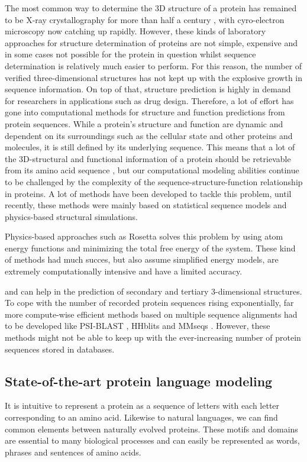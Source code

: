The most common way to determine the 3D structure of a protein has remained to be X-ray crystallography for more than half a century \cite{xray}, with cyro-electron microscopy now catching up rapidly.\cite{cyroem} However, these kinds of laboratory approaches for structure determination of proteins are not simple, expensive and in some cases not possible for the protein in question whilst sequence determination is relatively much easier to perform. For this reason, the number of verified three-dimensional structures has not kept up with the explosive growth in sequence information. On top of that, structure prediction is highly in demand for researchers in applications such as drug design. Therefore, a lot of effort has gone into computational methods for structure and function predictions from protein sequences. While a protein's structure and function are dynamic and dependent on its surroundings such as the cellular state and other proteins and molecules, it is still defined by its underlying sequence. This means that a lot of the 3D-structural and functional information of a protein should be retrievable from its amino acid sequence \cite{structure}, but our computational modeling abilities continue to be challenged by the complexity of the sequence-structure-function relationship in proteins. A lot of methods have been developed to tackle this problem, until recently, these methods were mainly based on statistical sequence models and physics-based structural simulations.

Physics-based approaches such as Rosetta \cite{rosetta} solves this problem by using atom energy functions and minimizing the total free energy of the system. These kind of methods had much succes, but also assume simplified energy models, are extremely computationally intensive and have a limited accuracy.\cite{review}

and can help in the prediction of secondary and tertiary 3-dimensional structures. To cope with the number of recorded protein sequences rising exponentially, far more compute-wise efficient methods based on multiple sequence alignments had to be developed like PSI-BLAST \cite{psiblast}, HHblits \cite{hhblits3} and MMseqs \cite{mmseqs2}. However, these methods might not be able to keep up with the ever-increasing number of protein sequences stored in databases.

\subsection{State-of-the-art protein language modeling}
It is intuitive to represent a protein as a sequence of letters with each letter corresponding to an amino acid. Likewise to natural languages, we can find common elements between naturally evolved proteins. These motifs and domains are essential to many biological processes and can easily be represented as words, phrases and sentences of amino acids.